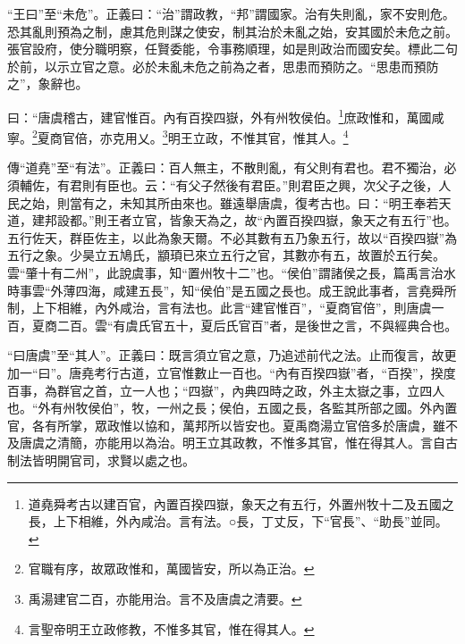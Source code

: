 {\noindent\shu{}\fzkt “王曰”至“未危”。正義曰：“治”謂政教，“邦”謂國家。治有失則亂，家不安則危。恐其亂則預為之制，慮其危則謀之使安，制其治於未亂之始，安其國於未危之前。張官設府，使分職明察，任賢委能，令事務順理，如是則政治而國安矣。標此二句於前，以示立官之意。必於未亂未危之前為之者，思患而預防之。“思患而預防之”，象辭也。 \par}

曰：“唐虞稽古，建官惟百。內有百揆四嶽，外有州牧侯伯。\footnote{道堯舜考古以建百官，內置百揆四嶽，象天之有五行，外置州牧十二及五國之長，上下相維，外內咸治。言有法。○長，丁丈反，下“官長”、“助長”並同。}庶政惟和，萬國咸寧。\footnote{官職有序，故眾政惟和，萬國皆安，所以為正治。}夏商官倍，亦克用乂。\footnote{禹湯建官二百，亦能用治。言不及唐虞之清要。}明王立政，不惟其官，惟其人。\footnote{言聖帝明王立政修教，不惟多其官，惟在得其人。}


{\noindent\zhuan{}\fzbyks 傳“道堯”至“有法”。正義曰：百人無主，不散則亂，有父則有君也。君不獨治，必須輔佐，有君則有臣也。云：“有父子然後有君臣。”則君臣之興，次父子之後，人民之始，則當有之，未知其所由來也。雖遠舉唐虞，復考古也。曰：“明王奉若天道，建邦設都。”則王者立官，皆象天為之，故“內置百揆四嶽，象天之有五行”也。五行佐天，群臣佐主，以此為象天爾。不必其數有五乃象五行，故以“百揆四嶽”為五行之象。少昊立五鳩氏，顓頊已來立五行之官，其數亦有五，故置於五行矣。雲“肇十有二州”，此說虞事，知“置州牧十二”也。“侯伯”謂諸侯之長，篇禹言治水時事雲“外薄四海，咸建五長”，知“侯伯”是五國之長也。成王說此事者，言堯舜所制，上下相維，內外咸治，言有法也。此言“建官惟百”，“夏商官倍”，則唐虞一百，夏商二百。雲“有虞氏官五十，夏后氏官百”者，是後世之言，不與經典合也。 \par}

{\noindent\shu{}\fzkt “曰唐虞”至“其人”。正義曰：既言須立官之意，乃追述前代之法。止而復言，故更加一“曰”。唐堯考行古道，立官惟數止一百也。“內有百揆四嶽”者，“百揆”，揆度百事，為群官之首，立一人也；“四嶽”，內典四時之政，外主太嶽之事，立四人也。“外有州牧侯伯”，牧，一州之長；侯伯，五國之長，各監其所部之國。外內置官，各有所掌，眾政惟以協和，萬邦所以皆安也。夏禹商湯立官倍多於唐虞，雖不及唐虞之清簡，亦能用以為治。明王立其政教，不惟多其官，惟在得其人。言自古制法皆明開官司，求賢以處之也。 \par}

